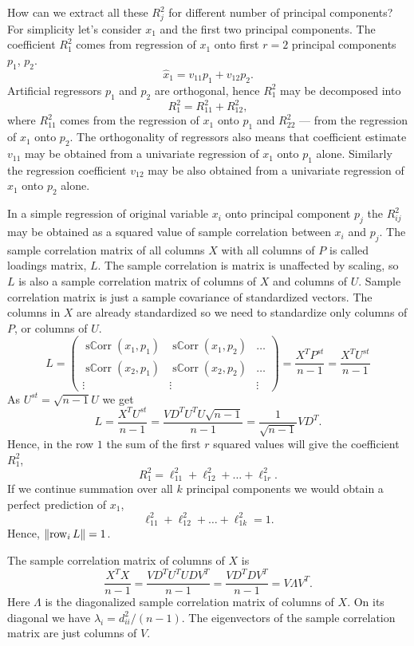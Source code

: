 \documentclass[12pt]{article}
\DeclareMathOperator{\sCorr}{s\mathbb{C}orr}
\DeclareMathOperator{\row}{row}
\DeclarePairedDelimiter{\norm}{\lVert}{\rVert}
\begin{document}
How can we extract all these $R^2_j$ for different number of principal components?
For simplicity let's consider $x_1$ and the first two principal components.
The coefficient $R^2_1$ comes from regression of $x_1$ onto first $r = 2$ principal components $p_1$, $p_2$.
\[
\hat x_1 = v_{11} p_1 + v_{12} p_2.
\]
Artificial regressors $p_1$ and $p_2$ are orthogonal, hence $R^2_1$ may be decomposed into 
\[
R^2_1 = R^2_{11} + R^2_{12},
\]
where $R^2_{11}$ comes from the regression of $x_1$ onto $p_1$ and $R^2_{22}$ — from the regression of $x_1$ onto $p_2$.
The orthogonality of regressors also means that coefficient estimate $v_{11}$ may be obtained from a univariate regression of $x_1$ onto $p_1$ alone. 
Similarly the regression coefficient $v_{12}$ may be also obtained from a univariate regression of $x_1$ onto $p_2$ alone. 

In a simple regression of original variable $x_i$ onto principal component $p_j$ the $R^2_{ij}$ may be obtained as a squared value of sample correlation between $x_i$ and $p_j$.
The sample correlation matrix of all columns $X$ with all columns of $P$ is called loadings matrix, $L$.
The sample correlation is matrix is unaffected by scaling, so $L$ is also a sample correlation matrix of columns of $X$ and columns of $U$.
Sample correlation matrix is just a sample covariance of standardized vectors.
The columns in $X$ are already standardized so we need to standardize only columns of $P$, or columns of $U$.
\[
L = \begin{pmatrix}
    \sCorr(x_1, p_1) & \sCorr(x_1, p_2) & \ldots \\
    \sCorr(x_2, p_1) & \sCorr(x_2, p_2) & \ldots \\
    \vdots & \vdots & \vdots 
\end{pmatrix} = 
\frac{X^T P^{st}}{n - 1} = \frac{X^T U^{st}}{n - 1}
\]
As $U^{st} = \sqrt{n-1} U$ we get
\[
L =  \frac{X^T U^{st}}{n - 1} = \frac{VD^T U^T U\sqrt{n-1}}{n-1} = \frac{1}{\sqrt{n-1}}V D^T.
\]
Hence, in the row $1$ the sum of the first $r$ squared values will give the coefficient $R^2_1$,
\[
R^2_1 = \ell_{11}^2 + \ell_{12}^2 + \dots + \ell_{1r}^2.
\]
If we continue summation over all $k$ principal components we would obtain a perfect prediction of $x_1$,
\[
    \ell_{11}^2 + \ell_{12}^2 + \dots + \ell_{1k}^2 = 1.
\]
Hence, $\norm{\row_i L} = 1$.

The sample correlation matrix of columns of $X$ is
\[
\frac{X^T X}{n-1} = \frac{V D^T U^T UDV^T}{n - 1} = \frac{V D^T D V^T}{ n - 1} = V \Lambda V^T.
\]
Here $\Lambda$ is the diagonalized sample correlation matrix of columns of $X$.
On its diagonal we have $\lambda_i = d_{ii}^2 / (n - 1)$.
The eigenvectors of the sample correlation matrix are just columns of $V$. 
\end{document}
